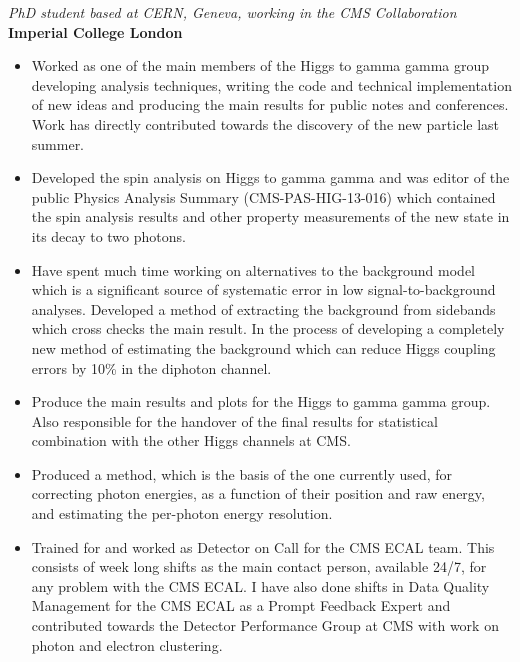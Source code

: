 \documentclass[margin, 10pt]{res} %
\begin{document}
\begin{resume}
{\sl PhD student based at CERN, Geneva, working in the CMS Collaboration}\\%
{\bf Imperial College London}
\begin{itemize} \itemsep -2pt %
\item Worked as one of the main members of the Higgs to gamma gamma group developing analysis techniques, writing the
code and technical implementation of new ideas and producing the main results for public notes and conferences.
Work has directly contributed towards the discovery of the new particle last summer.
\item Developed the spin analysis on Higgs to gamma gamma and was editor of the public Physics Analysis Summary (CMS-PAS-HIG-13-016) which contained the spin analysis results and other property measurements of the new state in its decay to two photons.
\item Have spent much time working on alternatives to the background model which is a significant source of systematic error in low signal-to-background analyses. Developed a method of extracting the background from sidebands which cross checks the main result. In the process of developing a completely new method of estimating the background which can reduce Higgs coupling errors by 10\% in the diphoton channel.
\item Produce the main results and plots for the Higgs to gamma gamma group. Also responsible for the handover of
the final results for statistical combination with the other Higgs channels at CMS.
\item Produced a method, which is the basis of the one currently used, for correcting photon energies, as a function of their position and raw energy, and estimating the per-photon energy resolution.
\item Trained for and worked as Detector on Call for the CMS ECAL team. This consists of week long shifts as the main contact person, available 24/7, for any problem with the CMS ECAL. I have also done shifts in Data Quality Management for the CMS ECAL as a Prompt Feedback Expert and contributed towards the Detector Performance Group at CMS with work on photon and electron clustering.
\end{itemize}


\end{resume}
\end{document}
